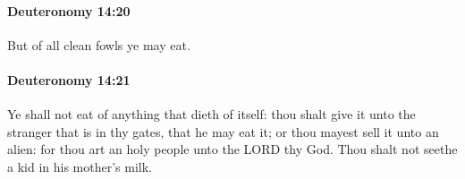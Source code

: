 		\paragraph{Deuteronomy 14:20} %
			\label{DEUTERONOMY-14-20}

			But of all clean fowls ye may eat.


		\paragraph{Deuteronomy 14:21} %
			\label{DEUTERONOMY-14-21}

			Ye shall not eat of anything that dieth of itself: thou shalt give it unto the stranger that is in thy gates, that he may eat it; or thou mayest sell it unto an alien: for thou art an holy people unto the LORD thy God. Thou shalt not seethe a kid in his mother's milk.


